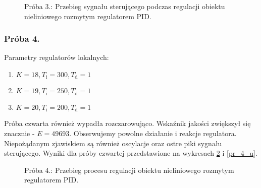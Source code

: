 \begin{figure}[b]
    \centering
    \caption{Próba 3.: Przebieg sygnału sterującego podczas regulacji obiektu nieliniowego rozmytym regulatorem PID.}
    \label{pr_3_u}
\end{figure}


\subsubsection{Próba 4.}
Parametry regulatorów lokalnych:
\begin{enumerate}
\item $K = 18, T_{\mathrm{i}} = 300,  T_{\mathrm{d}} = 1$
\item $K = 19, T_{\mathrm{i}} = 250,  T_{\mathrm{d}} = 1$
\item $K = 20, T_{\mathrm{i}} = 200,  T_{\mathrm{d}} = 1$
\end{enumerate}
Próba czwarta również wypadła rozczarowująco. Wskaźnik jakości zwiększył się znacznie - $E = \num{49693}$. Obserwujemy powolne działanie i reakcje regulatora. Niepożądanym zjawiskiem są również oscylacje oraz ostre piki sygnału sterującego. Wyniki dla próby czwartej przedstawione na wykresach \ref{pr_4_y} i \ref{pr_4_u}.

\begin{figure}[t]
    \centering
    \caption{Próba 4.: Przebieg procesu regulacji obiektu nieliniowego rozmytym regulatorem PID.}
    \label{pr_4_y}
\end{figure}

